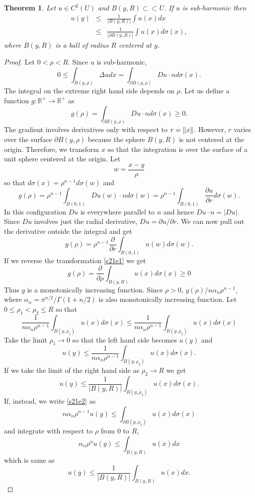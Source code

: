 \documentclass{article}
\newcommand{\pd}[2]{\frac{\partial{#1}}{\partial{#2}}}
\newcommand{\cce}{\subset\subset}
\DeclarePairedDelimiter\norm{\lVert}{\rVert}
\theoremstyle{plain}
\newtheorem{thm}{Theorem}
\numberwithin{thm}{section}
\theoremstyle{plain}
\numberwithin{prop}{section}
\theoremstyle{definition}
\numberwithin{defn}{section}
\theoremstyle{remark}
\numberwithin{equation}{section}
\begin{document}
\begin{thm}\label{s21t1}
Let $u \in C^2(U)$ and $B(y, R) \cce U$. If $u$ is sub-harmonic then
\begin{eqnarray*}
u(y) &\le& \frac{1}{|B(y, R)|}\int u(x)dx \\
 &\le& \frac{1}{|\partial B(y, R)|}\int u(x)d\sigma(x),
\end{eqnarray*}
where $B(y, R)$ is a ball of radius $R$ centered at $y$.
\end{thm}
\begin{proof}
Let $0 < \rho < R$. Since $u$ is sub-harmonic,
\[
0 \le \int_{B(y,\rho)}\Delta u dx = \int_{\partial B(y,\rho)} Du \cdot nd\sigma(x).
\]
The integral on the extreme right hand side depends on $\rho$. Let us define a function $g: \mathbb{R}^+ 
\rightarrow \mathbb{R}^+$ as
\[
g(\rho) = \int_{\partial B(y,\rho)} Du \cdot nd\sigma(x) \ge 0.
\]
The gradient involves derivatives only with respect to $r = \norm{x}$. However, $r$ varies over the surface 
$\partial B(y,\rho)$ because the sphere $B(y, R)$ is not centered at the origin. Therefore, we transform $x$ so that
the integration is over the surface of a unit sphere centered at the origin. Let 
\begin{equation}\label{s21e1}
w = \frac{x - y}{\rho}
\end{equation}
so that $d\sigma(x) = \rho^{n-1}d\sigma(w)$ and
\[
g(\rho) = \rho^{n-1}\int_{B(0,1)} Du(w)\cdot nd\sigma(w) = \rho^{n-1}\int_{B(0,1)} \pd{u}{r} d\sigma(w).
\]
In this configuration $Du$ is everywhere parallel to $n$ and hence $Du \cdot n = |Du|$. Since $Du$ involves just 
the radial derivative, $Du = \partial u/\partial r$. We can now pull out the derivative outside the integral and
get
\[
g(\rho) = \rho^{n-1}\frac{\partial}{\partial r}\int_{B(0,1)} u(w)d\sigma(w).
\]
If we reverse the transformation \eqref{s21e1} we get
\[
g(\rho) = \frac{\partial}{\partial\rho}\int_{B(y, R)} u(x)d\sigma(x) \ge 0
\]
Thus $g$ is a monotonically increasing function. Since $\rho > 0$, $g(\rho)/n\alpha_n\rho^{n-1}$, where $\alpha_n
= \pi^{n/2}/\Gamma(1 + n/2)$ is also monotonically increasing function. Let $0 \le \rho_1 < \rho_2 \le R$ so that
\[
\frac{1}{n\alpha_n\rho^{n-1}}\int_{B(y,\rho_1)} u(x)d\sigma(x) \le 
\frac{1}{n\alpha_n\rho^{n-1}}\int_{B(y,\rho_2)} u(x)d\sigma(x)
\]
Take the limit $\rho_1 \rightarrow 0$ so that the left hand side becomes $u(y)$ and
\begin{equation}\label{s21e2}
u(y) \le \frac{1}{n\alpha_n\rho^{n-1}}\int_{B(y,\rho_2)} u(x)d\sigma(x).
\end{equation}
If we take the limit of the right hand side as $\rho_2 \rightarrow R$ we get
\[
u(y) \le \frac{1}{|B(y, R)|}\int_{B(y,\rho_2)} u(x)d\sigma(x).
\]
If, instead, we write \eqref{s21e2} as
\[
n\alpha_n\rho^{n-1} u(y) \le \int_{\partial B(y,\rho_2)} u(x)d\sigma(x)
\]
and integrate with respect to $\rho$ from $0$ to $R$,
\[
\alpha_n \rho^n u(y) \le \int_{B(y, R)} u(x) dx
\]
which is same as
\[
u(y) \le \frac{1}{|B(y, R)|}\int_{B(y, R)} u(x) dx.
\]
\end{proof}
\end{document}
